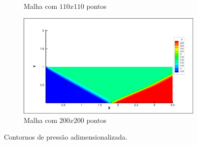\documentclass[a4paper, twoside, 12pt]{article}
\numberwithin{equation}{section}
\begin{document}
\begin{figure}[H]
\begin{subfigure}{.5\textwidth}
            \caption{Malha com $110x110$ pontos}
            \label{fig:sfig1}
            \end{subfigure}%
            \begin{subfigure}{.5\textwidth}
            \centering
            \includegraphics[width=.9\linewidth]{pics/pressure_200200.png}
            \caption{Malha com $200x200$ pontos}
            \label{fig:sfig2}
            \end{subfigure}

        \caption{Contornos de pressão adimensionalizada.}
        \vspace*{-5pt}
        \label{fig:fig}
        \end{figure}
\end{document}

